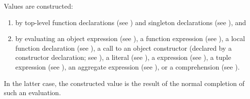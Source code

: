 Values are constructed:
\begin{enumerate}
\item by top-level function declarations (see )
and singleton declarations (see ),
and
\item by evaluating an object expression (see ),
a function expression (see ),
a local function declaration (see ),
a call to an object constructor
(declared by a constructor declaration; see ),
a literal (see ),
a  expression (see ),
a tuple expression (see ),
an aggregate expression (see ),
or a comprehension (see ).
\end{enumerate}
In the latter case,
the constructed value is the result of
the normal completion of such an evaluation.
